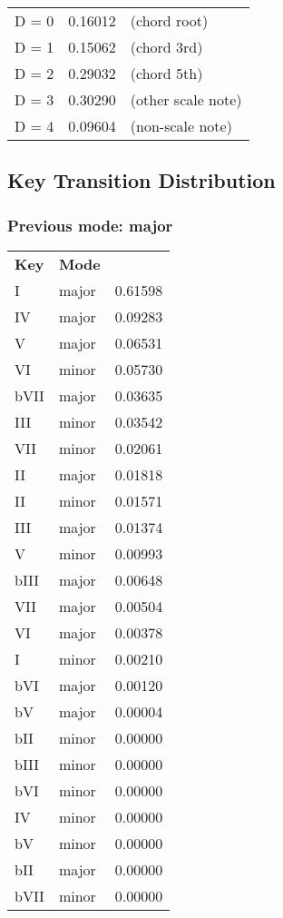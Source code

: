 \begin{tabular}{l l l}
D = 0 & 0.16012 & (chord root)\\
D = 1 & 0.15062 & (chord 3rd)\\
D = 2 & 0.29032 & (chord 5th)\\
D = 3 & 0.30290 & (other scale note)\\
D = 4 & 0.09604 & (non-scale note)\\
\end{tabular}


\subsection{Key Transition Distribution}

\subsubsection*{Previous mode: major}

\begin{tabular}{l l l}
\textbf{Key} & \textbf{Mode} \\
I & major & 0.61598 \\
IV & major & 0.09283 \\
V & major & 0.06531 \\
VI & minor & 0.05730 \\
bVII & major & 0.03635 \\
III & minor & 0.03542 \\
VII & minor & 0.02061 \\
II & major & 0.01818 \\
II & minor & 0.01571 \\
III & major & 0.01374 \\
V & minor & 0.00993 \\
bIII & major & 0.00648 \\
VII & major & 0.00504 \\
VI & major & 0.00378 \\
I & minor & 0.00210 \\
bVI & major & 0.00120 \\
bV & major & 0.00004 \\
bII & minor & 0.00000 \\
bIII & minor & 0.00000 \\
bVI & minor & 0.00000 \\
IV & minor & 0.00000 \\
bV & minor & 0.00000 \\
bII & major & 0.00000 \\
bVII & minor & 0.00000 \\
\end{tabular}

